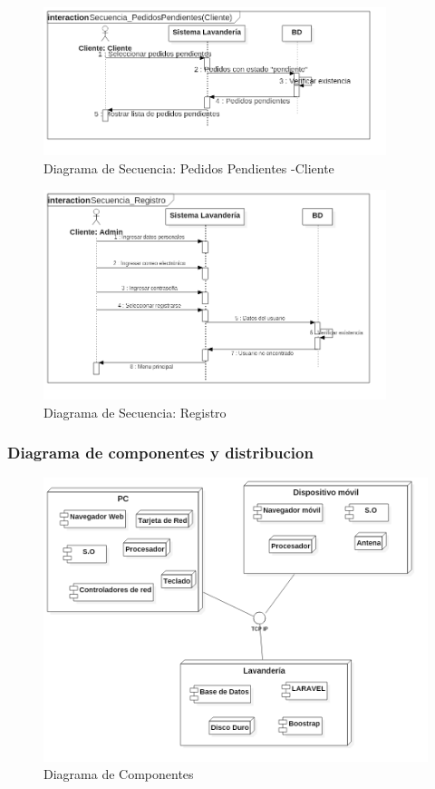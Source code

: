 \begin{figure}[htb]
\begin{center}
\includegraphics[width=10cm]{./imagenes/diagramas/Secuencia_PedidosPendientes(Cliente).png}
\end{center}
\caption{Diagrama de Secuencia: Pedidos Pendientes -Cliente}
\end{figure}



\begin{figure}[htb]
\begin{center}
\includegraphics[width=10cm]{./imagenes/diagramas/Secuencia_Registro.png}
\end{center}
\caption{Diagrama de Secuencia: Registro}
\end{figure}




\newpage




\subsubsection{Diagrama de componentes y distribucion}


\begin{figure}[h]
\begin{center}
\includegraphics[width=20cm]{./imagenes/diagramas/Com-Dis_Lavanderia.png}
\end{center}
\caption{Diagrama de Componentes}
\end{figure}




